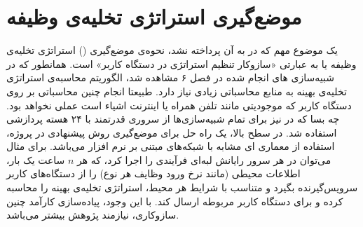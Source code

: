 \section{موضع‌گیری استراتژی تخلیه‌ی وظیفه}
یک موضوع مهم که در \CurrentProject به آن پرداخته نشد، نحوه‌ی موضع‌گیری () استراتژی تخلیه‌ی وظیفه یا به عبارتی «سازوکار تنظیم استراتژی در دستگاه کاربر» است. همانطور که در شبیه‌سازی های انجام شده در فصل ۶ مشاهده شد، الگوریتم محاسبه‌ی استراتژی تخلیه‌ی بهینه به منابع محاسباتی زیادی نیاز دارد. طبیعتا انجام چنین محاسباتی بر روی دستگاه کاربر که موجودیتی مانند تلفن همراه یا اینترنت اشیاء است عملی نخواهد بود. چه بسا که در \CurrentProject نیز برای تمام شبیه‌سازی‌ها از سروری قدرتمند با ۲۴ هسته پردازشی استفاده شد. در سطح بالا، یک راه حل برای موضع‌گیری روش پیشنهادی در پروژه، استفاده از معماری ای مشابه با شبکه‌های مبتنی بر نرم افزار می‌باشد. برای مثال می‌توان در هر سرور رایانش لبه‌ای فرآیندی را اجرا کرد، که هر $n$ ساعت یک بار، اطلاعات محیطی (مانند نرخ ورود وظایف هر نوع) را از دستگاه‌های کاربر سرویس‌گیرنده بگیرد و متناسب با شرایط هر محیط، استراتژی تخلیه‌ی بهینه را محاسبه کرده و برای دستگاه کاربر مربوطه ارسال کند. با این وجود، پیاده‌سازی کارآمد چنین سازوکاری، نیازمند پژوهش بیشتر می‌باشد.
\clearpage